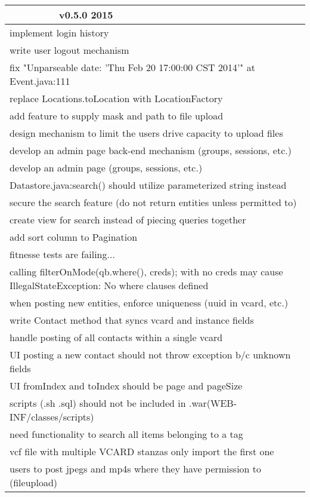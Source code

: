 \documentclass[notitlepage]{article}
\newcommand{\releasedate}{2015}
\begin{document}
\begin{center}
\begin{tabular}{ | l | }
\hline
\LARGE\cellcolor{myblue}\textcolor{white}{khallware} v0.5.0 \releasedate{} \\
\hline
implement login history \\
\hline
write user logout mechanism \\
\hline
fix "Unparseable date: 'Thu Feb 20 17:00:00 CST 2014'" at Event.java:111 \\
\hline
replace Locations.toLocation with LocationFactory \\
\hline
add feature to supply mask and path to file upload \\
\hline
design mechanism to limit the users drive capacity to upload files \\
\hline
develop an admin page back-end mechanism (groups, sessions, etc.) \\
\hline
develop an admin page (groups, sessions, etc.) \\
\hline
Datastore.java:search() should utilize parameterized string instead \\
\hline
secure the search feature (do not return entities unless permitted to) \\
\hline
create view for search instead of piecing queries together \\
\hline
add sort column to Pagination \\
\hline
fitnesse tests are failing... \\
\hline
calling filterOnMode(qb.where(), creds); with no creds may cause IllegalStateException: No where clauses defined \\
\hline
when posting new entities, enforce uniqueness (uuid in vcard, etc.) \\
\hline
write Contact method that syncs vcard and instance fields \\
\hline
handle posting of all contacts within a single vcard \\
\hline
UI posting a new contact should not throw exception b/c unknown fields \\
\hline
UI fromIndex and toIndex should be page and pageSize \\
\hline
scripts (.sh .sql) should not be included in .war(WEB-INF/classes/scripts) \\
\hline
need functionality to search all items belonging to a tag \\
\hline
vcf file with multiple VCARD stanzas only import the first one \\
\hline
users to post jpegs and mp4s where they have permission to (fileupload) \\
\hline

\end{tabular}
\end{center}
\end{document}
